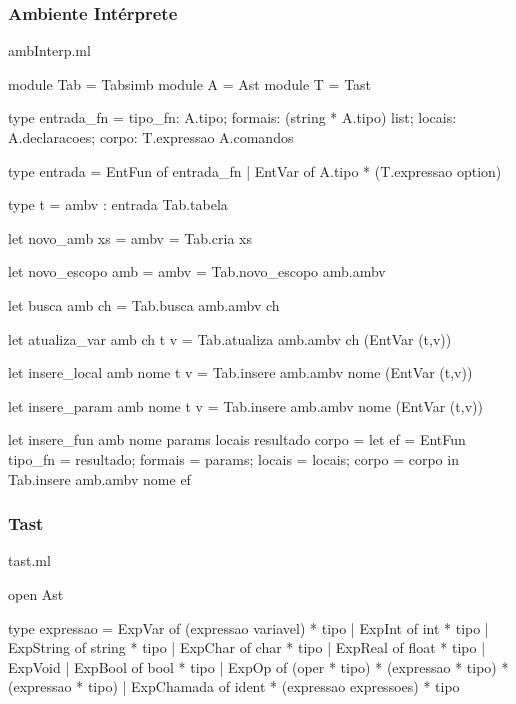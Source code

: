 \documentclass[12pt,a4paper,twoside]{article}
\begin{document}
\subsubsection{Ambiente Intérprete}
ambInterp.ml
\begin{terminal}
module Tab = Tabsimb
module A = Ast
module T = Tast

type entrada_fn = { 
  tipo_fn:  A.tipo;
  formais: (string * A.tipo) list;
  locais:  A.declaracoes;
  corpo: T.expressao A.comandos
}

type entrada =  EntFun of entrada_fn
             |  EntVar of A.tipo * (T.expressao option)

type t = {
  ambv : entrada Tab.tabela
}

let novo_amb xs = { ambv = Tab.cria xs }

let novo_escopo amb = { ambv = Tab.novo_escopo amb.ambv }

let busca amb ch = Tab.busca amb.ambv ch

let atualiza_var amb ch t v =
  Tab.atualiza amb.ambv ch (EntVar (t,v))

let insere_local amb nome t v =
  Tab.insere amb.ambv nome (EntVar (t,v))

let insere_param amb nome t v =
  Tab.insere amb.ambv nome (EntVar (t,v))

let insere_fun amb nome params locais resultado corpo =
  let ef = EntFun { tipo_fn = resultado;
                    formais = params;
                    locais = locais;
                    corpo = corpo }
  in Tab.insere amb.ambv nome ef
\end{terminal}
\subsubsection{Tast}
tast.ml
\begin{terminal}
open Ast

type expressao = ExpVar of (expressao variavel) * tipo
              | ExpInt of int * tipo
              | ExpString of string * tipo
              | ExpChar of char * tipo
              | ExpReal of float * tipo
              | ExpVoid
              | ExpBool of bool * tipo
              | ExpOp of (oper * tipo) * (expressao * tipo) * (expressao * tipo)
              | ExpChamada of ident * (expressao expressoes) * tipo

\end{terminal}
\end{document}
